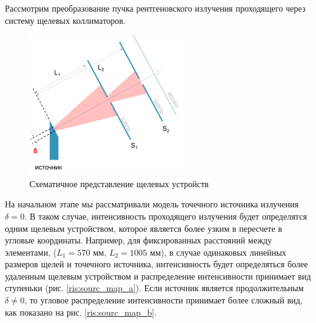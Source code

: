 \label{sec:slits_section}
Рассмотрим преобразование пучка рентгеновского излучения проходящего через систему щелевых коллиматоров.
\begin{figure}[H]
  \centering
  \includegraphics[width=0.6\textwidth]{images/for_slits.png}
  \caption{Схематичное представление щелевых устройств}
  \label{ris:for_slits}
\end{figure}

На начальном этапе мы рассматривали модель точечного источника излучения $\delta = 0$.
В таком случае, интенсивность проходящего излучения будет определятся
одним щелевым устройством, которое является более узким в пересчете в угловые
координаты. Например, для фиксированных расстояний между элементами,
($L_1 = 570$ мм, $L_2 = 1005$ мм), в случае одинаковых линейных размеров щелей и точечного
источника, интенсивность будет определяться более удаленным щелевым устройством и
распределение интенсивности принимает вид ступеньки (рис. \ref{ris:sourc_map_a}). Если источник является
продолжительным $\delta \neq 0$, то угловое распределение интенсивности принимает более сложный вид, как показано на рис. \ref{ris:sourc_map_b}.



